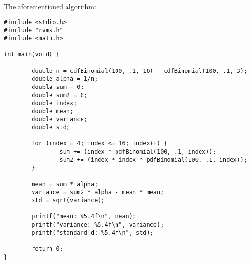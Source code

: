 \documentclass[11pt]{article} %
\begin{document}
\begin{enumerate}
\begin{enumerate}
The aforementioned algorithm:

\begin{verbatim}
#include <stdio.h>
#include "rvms.h"
#include <math.h>

int main(void) {
	
        double n = cdfBinomial(100, .1, 16) - cdfBinomial(100, .1, 3);
        double alpha = 1/n;
        double sum = 0;
        double sum2 = 0;
        double index;
        double mean;
        double variance;
        double std; 
	
        for (index = 4; index <= 16; index++) {
                sum += (index * pdfBinomial(100, .1, index));
                sum2 += (index * index * pdfBinomial(100, .1, index));
        }
	
        mean = sum * alpha;
        variance = sum2 * alpha - mean * mean;
        std = sqrt(variance);
	
       	printf("mean: %5.4f\n", mean);
        printf("variance: %5.4f\n", variance);
        printf("standard d: %5.4f\n", std);
	
        return 0;
}
\end{verbatim}

\end{enumerate}

\end{enumerate}
\end{document}
